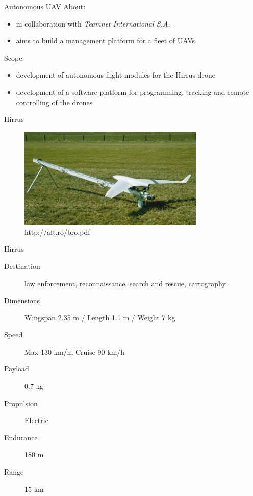 \documentclass{beamer}
\begin{document}
\begin{frame}{Autonomous UAV}
About:
\begin{itemize}
\item in collaboration with \textit{Teamnet International S.A.}
\item aims to build a management platform for a fleet of UAVs
\end{itemize}
Scope:
\begin{itemize}
\item development of autonomous flight modules for the Hirrus drone
\item development of a software platform for programming, tracking and remote
controlling of the drones
\end{itemize}
\end{frame}

\begin{frame}{Hirrus}
\begin{center}
\begin{figure}[p]
\includegraphics[width=3.5in]{img/hirrus.jpg}
\caption{http://aft.ro/bro.pdf}
\end{figure}
\end{center}
\end{frame}

\begin{frame}{Hirrus}

\begin{description}
\item [Destination] law enforcement, reconnaissance, search and rescue, cartography
\item [Dimensions] Wingspan 2.35 m / Length 1.1 m / Weight 7 kg
\item [Speed] Max 130 km/h, Cruise 90 km/h
\item [Payload] 0.7 kg
\item [Propulsion] Electric
\item [Endurance] 180 m
\item [Range] 15 km
\end{description}

\end{frame}
\end{document}
